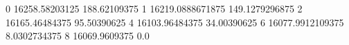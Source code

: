 0 16258.58203125 188.62109375
1 16219.0888671875 149.1279296875
2 16165.46484375 95.50390625
4 16103.96484375 34.00390625
6 16077.9912109375 8.0302734375
8 16069.9609375 0.0
